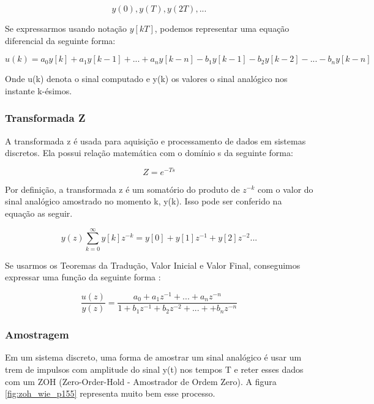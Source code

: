 \begin{equation}
  y(0), y(T), y(2T), ...
\end{equation}

Se expressarmos usando notação ${y[kT]}$, podemos representar uma equação diferencial da seguinte forma:

\begin{equation}
  u(k) = a_{0}y[k]+a_{1}y[k-1]+...+a_{n}y[k-n] - b_{1}y[k-1] - b_{2}y[k-2] - ... -b_{n}y[k-n]
\end{equation}

Onde u(k) denota o sinal computado e y(k) os valores o sinal analógico nos instante k-ésimos.


\subsubsection{Transformada Z}

A transformada z é usada para aquisição e processamento de dados em sistemas discretos. Ela possui relação matemática com o domínio s da seguinte forma:

\begin{equation}
Z = e^{-Ts}
\end{equation}

Por definição, a transformada z é um somatório do produto de $z^{-k}$ com o valor do sinal analógico amostrado no momento k, y(k). Isso pode ser conferido na equação as seguir.

\begin{equation}
  y(z) \sum_{k=0}^{\infty}{y[k]z^{-k}} = y[0] + y[1]z^{-1}+y[2]z^{-2}...
 \end{equation} 

 Se usarmos os Teoremas da Tradução, Valor Inicial e Valor Final, conseguimos expressar uma função da seguinte forma \cite{BongWie2001}:

\begin{equation}
  \frac{u(z)}{y(z)} = \frac{a_0 + a_1z^{-1}+...+a_nz^{-n}}{1+b_1z^{-1}+b_2z^{-2}+...++b_nz^{-n}}
\end{equation}


\subsubsection{Amostragem}

Em um sistema discreto, uma forma de amostrar um sinal analógico é usar um trem de impulsos com amplitude do sinal y(t) nos tempos T e reter esses dados com um ZOH (Zero-Order-Hold - Amostrador de Ordem Zero). A figura \ref{fig:zoh_wie_p155} representa muito bem esse processo.

